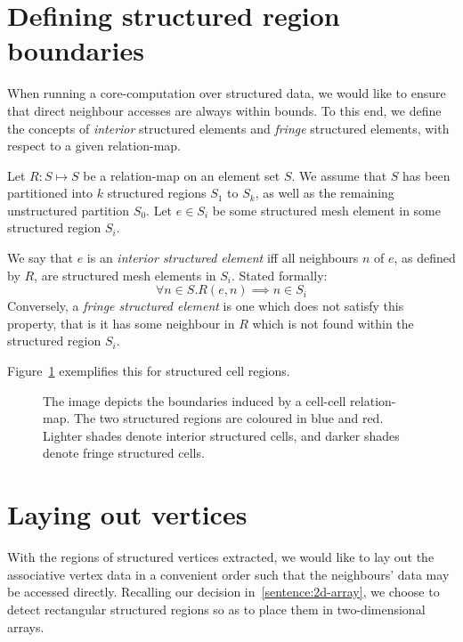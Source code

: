 
\section{Defining structured region boundaries}
When running a core-computation over structured data, we would like to ensure that direct neighbour accesses are always within bounds. To this end, we define the concepts of \emph{interior} structured elements and \emph{fringe} structured elements, with respect to a given relation-map.

Let $R: S \mapsto S$ be a relation-map on an element set $S$. We assume that $S$ has been partitioned into $k$ structured regions $S_1$ to $S_k$, as well as the remaining unstructured partition $S_0$.
Let $e \in S_i$ be some structured mesh element in some structured region $S_i$.

We say that $e$ is an \emph{interior structured element} iff all neighbours $n$ of $e$, as defined by $R$, are structured mesh elements in $S_i$. Stated formally:
$$\forall n \in S. R(e,n) \implies n \in S_i$$
Conversely, a \emph{fringe structured element} is one which does not satisfy this property, that is it has some neighbour in $R$ which is not found within the structured region $S_i$.

Figure~\ref{fig:fringe-cells} exemplifies this for structured cell regions.

\begin{figure}

\caption{The image depicts the boundaries induced by a cell-cell relation-map. The two structured regions are coloured in blue and red. Lighter shades denote interior structured cells, and darker shades denote fringe structured cells.}
\label{fig:fringe-cells}
\end{figure}


\section{Laying out vertices}
\label{subsec:vertex-associative-data}
With the regions of structured vertices extracted, we would like to lay out the associative vertex data in a convenient order such that the neighbours' data may be accessed directly. Recalling our decision in~\ref{sentence:2d-array}, we choose to detect rectangular structured regions so as to place them in two-dimensional arrays.

